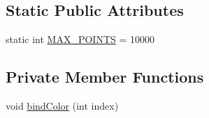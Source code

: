 \subsection*{Static Public Attributes}
\begin{DoxyCompactItemize}
\item 
static int \mbox{\hyperlink{classorg_1_1newdawn_1_1slick_1_1opengl_1_1renderer_1_1_quad_based_line_strip_renderer_a38b76f8ae2fbd9df9da795a0bfcd68cb}{M\+A\+X\+\_\+\+P\+O\+I\+N\+TS}} = 10000
\end{DoxyCompactItemize}
\subsection*{Private Member Functions}
\begin{DoxyCompactItemize}
\item 
void \mbox{\hyperlink{classorg_1_1newdawn_1_1slick_1_1opengl_1_1renderer_1_1_quad_based_line_strip_renderer_a4c1f3c2faa11f9c27467a12b9949143b}{bind\+Color}} (int index)
\end{DoxyCompactItemize}
